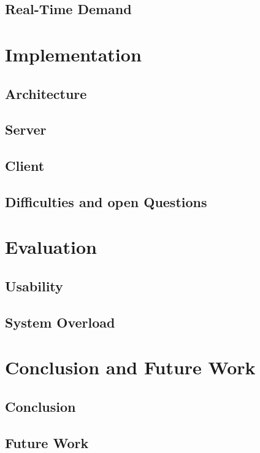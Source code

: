 \documentclass[english, BCOR=6mm, twoside=true, open=right]{tudscrreprt}
\begin{document}
\section{Real-Time Demand}

\chapter{Implementation}
\section{Architecture}
\section{Server}
\section{Client}
\section{Difficulties and open Questions}


\chapter{Evaluation}
\section{Usability}
\section{System Overload}


\chapter{Conclusion and Future Work}
\section{Conclusion}
\section{Future Work}


\newpage
{}
\listoffigures

\newpage
{}
\listoftables

\newpage
{}
\printglossary

\newpage
{}


\end{document}
